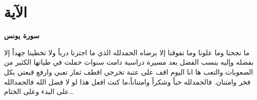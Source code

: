 \quranfont
\chapter*{الآية}
\begin{Large}
\begin{center}
	\basmalah\quranayah[10][10][8]
\end{center}
	\begin{flushleft}
\textbf{سورة يونس}
	\end{flushleft}
\end{Large}
\begin{large}
	ما نجحنا وما علونا وما تفوقنا إلا برضاه الحمدلله الذي ما اجتزنا درباً ولا تخطينا جهداً إلا بفضله وإليه ينسب الفضل 
	بعد مسيرة دراسية دامت سنوات حملت في طياتها الكثير من الصعوبات والتعب ها انا اليوم اقف على عتبة تخرجي اقطف ثمار تعبي وارفع قبعتي بكل فخر وامتنان.
	فالحمدلله حباً وشكراً وامتناناً،ما كنت افعل هذا لو لا فضل الله فالحمدالله على البدء وعلى الختام…
\end{large}
	







